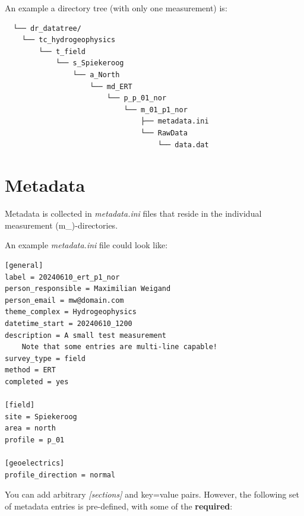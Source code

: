 \documentclass[fontsize=12]{scrartcl}
\begin{document}
An example a directory tree (with only one measurement) is:

\begin{verbatim}
  └── dr_datatree/
    └── tc_hydrogeophysics
        └── t_field
            └── s_Spiekeroog
                └── a_North
                    └── md_ERT
                        └── p_p_01_nor
                            └── m_01_p1_nor
                                ├── metadata.ini
                                └── RawData
                                    └── data.dat
\end{verbatim}

\clearpage
\section{Metadata}

Metadata is collected in \textsl{metadata.ini} files that reside in the
individual measurement (m\_)-directories.

An example \textsl{metadata.ini} file could look like:

\begin{verbatim}
[general]
label = 20240610_ert_p1_nor
person_responsible = Maximilian Weigand
person_email = mw@domain.com
theme_complex = Hydrogeophysics
datetime_start = 20240610_1200
description = A small test measurement
    Note that some entries are multi-line capable!
survey_type = field
method = ERT
completed = yes

[field]
site = Spiekeroog
area = north
profile = p_01

[geoelectrics]
profile_direction = normal
\end{verbatim}

You can add arbitrary \textsl{[sections]} and key=value pairs. However, the
following set of metadata entries is pre-defined, with some of the
\textbf{required}:
\newpage
{\footnotesize

}
\end{document}
